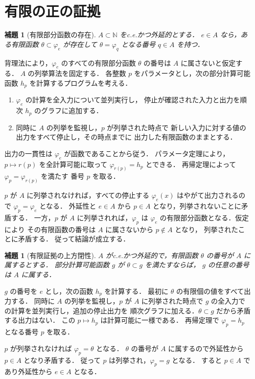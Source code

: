 \documentclass[a5paper,10pt,onecolumn]{jsarticle}
\makeatletter
\theoremstyle{mathnotetheorem}
\newtheorem{lemma}[theorem]{補題}
\renewcommand{\proofname}{証明}
\renewenvironment{proof}[1][\proofname]{%
  \par\pushQED{\qed}\normalfont\topsep4\p@\@plus2\p@\relax
  \trivlist\item[\hskip\labelsep\bfseries #1]\ignorespaces
}{\popQED\endtrivlist\@endpefalse}
\makeatother
\begin{document}
\section{有限の正の証拠}
\begin{lemma}[有限部分函数の存在]\label{lem:witness}
$A\subset\mathbb N$ をc.e.かつ外延的とする．
$e\in A$ なら，ある有限函数 $\theta\subset\varphi_e$ が存在して
$\theta=\varphi_q$ となる番号 $q\in A$ を持つ．
\end{lemma}
\begin{proof}
背理法により，$\varphi_e$ のすべての有限部分函数
$\theta$ の番号は $A$ に属さないと仮定する．
$A$ の列挙算法を固定する．
各整数 $p$ をパラメータとし，次の部分計算可能函数
$h_p$ を計算するプログラムを考える．
\begin{enumerate}
\item $\varphi_e$ の計算を全入力について並列実行し，
停止が確認された入力と出力を順次 $h_p$ のグラフに追加する．
\item 同時に $A$ の列挙を監視し，$p$ が列挙された時点で
新しい入力に対する値の出力をすべて停止し，その時点までに
出力した有限函数のままとする．
\end{enumerate}
出力の一貫性は $\varphi_e$ が函数であることから従う．
パラメータ定理により，$p\mapsto r(p)$ を全計算可能に取って
$\varphi_{r(p)}=h_p$ とできる．
再帰定理によって $\varphi_p=\varphi_{r(p)}$ を満たす
番号 $p$ を取る．

$p$ が $A$ に列挙されなければ，すべての停止する
$\varphi_e(x)$ はやがて出力されるので $\varphi_p=\varphi_e$ となる．
外延性と $e\in A$ から $p\in A$ となり，列挙されないことに矛盾する．
一方，$p$ が $A$ に列挙されれば，$\varphi_p$ は
$\varphi_e$ の有限部分函数となる．仮定により
その有限函数の番号は $A$ に属さないから $p\notin A$ となり，
列挙されたことに矛盾する．
従って結論が成立する．
\end{proof}

\begin{lemma}[有限証拠の上方閉性]\label{lem:up}
$A$ がc.e.かつ外延的で，有限函数 $\theta$ の番号が
$A$ に属するとする．
部分計算可能函数 $g$ が $\theta\subset g$ を満たすならば，
$g$ の任意の番号は $A$ に属する．
\end{lemma}
\begin{proof}
$g$ の番号を $e$ とし，次の函数 $h_p$ を計算する．
最初に $\theta$ の有限個の値をすべて出力する．
同時に $A$ の列挙を監視し，$p$ が $A$ に列挙された時点で
$g$ の全入力での計算を並列実行し，追加の停止出力を
順次グラフに加える．$\theta\subset g$ だから矛盾する出力はない．
この $p\mapsto h_p$ は計算可能に一様である．
再帰定理で $\varphi_p=h_p$ となる番号 $p$ を取る．

$p$ が列挙されなければ $\varphi_p=\theta$ となる．
$\theta$ の番号が $A$ に属するので外延性から $p\in A$ となり矛盾する．
従って $p$ は列挙され，$\varphi_p=g$ となる．
すると $p\in A$ であり外延性から $e\in A$ となる．
\end{proof}
\end{document}
